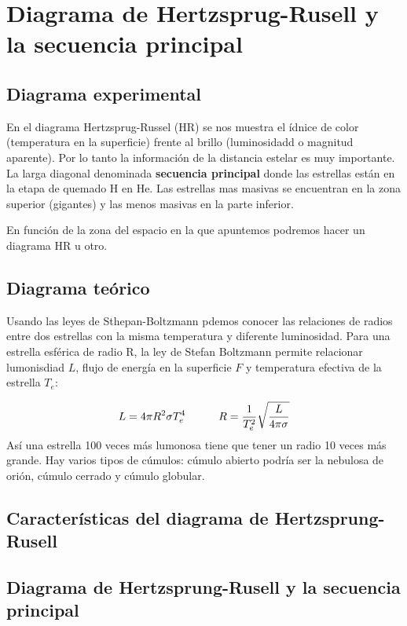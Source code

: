 \section{Diagrama de Hertzsprug-Rusell y la secuencia principal}

\subsection{Diagrama experimental}

En el diagrama Hertzsprug-Russel (HR) se nos muestra el ídnice de color (temperatura en la superficie) frente al brillo (luminosidadd o magnitud aparente). Por lo tanto la información de la distancia estelar es muy importante. La larga diagonal denominada \textbf{secuencia principal} donde las estrellas están en la etapa de quemado H en He. Las estrellas mas masivas se encuentran en la zona superior (gigantes) y las menos masivas en la parte inferior.

En función de la zona del espacio en la que apuntemos podremos hacer un diagrama HR u otro.

\subsection{Diagrama teórico}


Usando las leyes de Sthepan-Boltzmann pdemos conocer las relaciones de radios entre dos estrellas con la misma temperatura y diferente luminosidad. Para una estrella esférica de radio R, la ley de Stefan Boltzmann permite relacionar lumonisdiad $L$, flujo de energía en la superficie $F$ y temperatura efectiva de la estrella $T_e$:

\begin{equation}
	L = 4\pi R^2 \sigma T_e^4 \quad \quad \quad R = \frac{1}{T_e^2} \sqrt{\frac{L}{4\pi \sigma}}
\end{equation}
Así una estrella 100 veces más lumonosa tiene que tener un radio 10 veces más grande. Hay  varios tipos de cúmulos: cúmulo abierto podría ser la nebulosa de orión, cúmulo cerrado y cúmulo globular.

\subsection{Características del diagrama de Hertzsprung-Rusell}



\subsection{Diagrama de Hertzsprung-Rusell y la secuencia principal}

